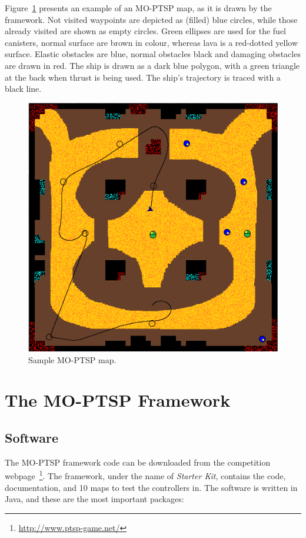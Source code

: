 \documentclass[conference]{IEEEtran}
\begin{document}
Figure~\ref{fig:sampleMap} presents an example of an MO-PTSP map, as it is drawn by the framework. Not visited waypoints are depicted as (filled) blue circles, while those already visited are shown as empty circles. Green ellipses are used for the fuel canisters,  normal surface are brown in colour, whereas lava is a red-dotted yellow surface. Elastic obstacles are blue, normal obstacles black and damaging obstacles are drawn in red. The ship is drawn as a dark blue polygon, with a green triangle at the back when thrust is being used. The ship's trajectory is traced with a black line.

\begin{figure} [!h]
	\begin{center}
	\includegraphics[width=0.7\columnwidth]{img/sampleMap}
	\caption{Sample MO-PTSP map.}
	\label{fig:sampleMap}
	\end{center}
\end{figure}


\section{The MO-PTSP Framework} \label{sec:contr}


\subsection{Software} \label{ssec:software}

The MO-PTSP framework code can be downloaded from the competition webpage~\footnote{\url{http://www.ptsp-game.net/}}. The framework, under the name of \textit{Starter Kit}, contains the code, documentation, and 10 maps to test the controllers in. The software is written in Java, and these are the most important packages:
\end{document}
